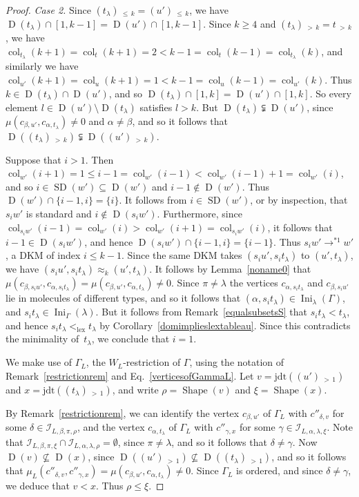 \documentclass[10pt]{amsart}
\theoremstyle{definition}
\newenvironment{Case}[1]{\smallskip\noindent\emph{Case #1}\endgraf
 \nobreak\noindent\ignorespaces}{\endgraf\smallskip}
\DeclareMathOperator{\Ini}{Ini}
\DeclareMathOperator{\lex}{lex}
\DeclareMathOperator{\col}{col}
\newcommand{\morethan}[2]{#1\,{_{>\,#2}}}
\newcommand{\Lessthan}[2]{#1\,{_{\leqslant\,#2}}}
\newcommand{\jdt}{\mathrm{jdt}}
\DeclareMathOperator{\shape}{Shape}
\DeclareMathOperator{\SD}{SD}
\DeclareMathOperator{\D}{D}
\begin{document}
\begin{proof}
\begin{Case}{2. }
Since $\Lessthan {(t_\lambda)}{k}=\Lessthan {(u')}k$, we have
$\D(t_\lambda)\cap[1,k-1]=\D(u')\cap[1,k-1]$. Since $k\geqslant 4$ and
$\morethan{(t_\lambda)}k=\morethan tk$, we have
$\col_{t_\lambda}(k+1)=\col_t(k+1)=2<k-1=\col_t(k-1)=\col_{t_\lambda}(k)$, and similarly
we have $\col_{u'}(k+1)=\col_u(k+1)=1<k-1=\col_u(k-1)=\col_{u'}(k)$.
Thus $k\in\D(t_\lambda)\cap\D(u')$, and so
$\D(t_\lambda)\cap[1,k]=\D(u')\cap[1,k]$. So every element $l\in\D(u')\setminus\D(t_\lambda)$
satisfies $l>k$. But $\D(t_\lambda)\subsetneqq\D(u')$, since
$\mu(c_{\beta,u'},c_{\alpha,t_\lambda})\neq 0$ and $\alpha\ne\beta$, and so
it follows that
$\D(\morethan{(t_\lambda)}k)\subsetneqq\D(\morethan{(u')}k)$.

Suppose that $i>1$. Then
$\col_{w'}(i+1)=1\leqslant i-1=\col_{w'}(i-1)<\col_{w'}(i-1)+1=\col_{w'}(i)$,
and so $i\in\SD(w')\subseteq\D(w')$ and $i-1\notin\D(w')$. Thus
$\D(w')\cap\{i-1,i\}=\{i\}$. It follows from $i\in\SD(w')$, or
by inspection, that $s_iw'$ is standard and $i\notin\D(s_iw')$.
Furthermore, since $\col_{s_iw'}(i-1)=\col_{w'}(i)>\col_{w'}(i+1)=\col_{s_iw'}(i)$, it
follows that $i-1\in\D(s_iw')$, and hence $\D(s_iw')\cap\{i-1,i\}=\{i-1\}$.
Thus $s_iw'\to^{*1} w'$, a DKM of index $i\leqslant k-1$.
Since the same DKM
takes $(s_iu',s_it_\lambda)$ to $(u',t_\lambda)$, we have
$(s_iu',s_it_\lambda)\approx_k(u',t_\lambda)$. It follows by Lemma~\ref{noname0} that
$\mu(c_{\beta,s_iu'},c_{\alpha,s_it_\lambda})=\mu(c_{\beta,u'},c_{\alpha,t_\lambda})\neq 0$.
Since $\pi\ne\lambda$ the vertices $c_{\alpha,s_it_\lambda}$ and $c_{\beta,s_iu'}$
lie in molecules of different types, and so it follows that
$(\alpha,s_it_\lambda)\in\Ini_{\lambda}(\Gamma)$, and
$s_it_\lambda\in\Ini_\Gamma(\lambda)$. But it follows from
Remark~\ref{equalsubsetsS} that $s_it_\lambda<t_\lambda$, and hence
$s_it_\lambda<_{\lex} t_\lambda$ by Corollary~\ref{domimplieslextableau}.
Since this contradicts the minimality of~$t_\lambda$, we conclude that $i=1$.

We make use of $\Gamma_L$, the $W_L$-restriction of $\Gamma$,
using the notation of Remark~\ref{restrictionrem} and Eq.~\eqref{verticesofGammaL}.
Let $v=\jdt(\morethan{(u')}{1})$ and $x=\jdt(\morethan{(t_\lambda)}{1})$, and write
$\rho=\shape(v)$ and $\xi=\shape(x)$.

By Remark~\ref{restrictionrem}, we can identify the vertex $c_{\beta,u'}$ of
$\Gamma_L$ with $c''_{\delta,v}$ for some $\delta\in\mathcal{I}_{L,\beta,\pi,\rho}$, and
the vertex $c_{\alpha,t_\lambda}$ of $\Gamma_L$ with $c''_{\gamma,x}$ for some
$\gamma\in\mathcal{I}_{L,\alpha,\lambda,\xi}$. Note that
$\mathcal{I}_{L,\beta,\pi,\xi}\cap\mathcal{I}_{L,\alpha,\lambda,\rho}=\emptyset$, since
$\pi\neq\lambda$, and so it follows that $\delta\neq\gamma$.
Now $\D(v)\nsubseteq\D(x)$, since $\D(\morethan{(u')}{1})\nsubseteq\D(\morethan{(t_\lambda)}{1})$,
and so it follows that $\mu_L(c''_{\delta,v},c''_{\gamma,x})=\mu(c_{\beta,u'},c_{\alpha,t_\lambda})\neq 0$.
Since $\Gamma_L$ is ordered, and since
$\delta\neq\gamma$, we deduce that $v<x$. Thus $\rho\leqslant\xi$.


\end{Case}
\end{proof}
\end{document}
